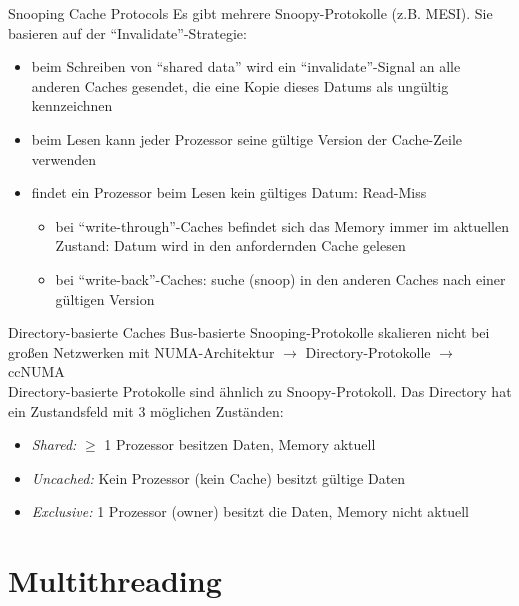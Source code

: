 \begin{defi}{Snooping Cache Protocols}
    Es gibt mehrere Snoopy-Protokolle (z.B. MESI). 
    Sie basieren auf der \enquote{Invalidate}-Strategie:
    \begin{itemize}
        \item beim Schreiben von \enquote{shared data} wird ein \enquote{invalidate}-Signal an alle anderen Caches gesendet,
              die eine Kopie dieses Datums als ungültig kennzeichnen
        \item beim Lesen kann jeder Prozessor seine gültige Version der Cache-Zeile verwenden
        \item findet ein Prozessor beim Lesen kein gültiges Datum: Read-Miss
              \begin{itemize}
                  \item bei \enquote{write-through}-Caches befindet sich das Memory immer im aktuellen Zustand:
                        Datum wird in den anfordernden Cache gelesen
                  \item bei \enquote{write-back}-Caches:
                        suche (snoop) in den anderen Caches nach einer gültigen Version
              \end{itemize}
    \end{itemize}
\end{defi}

\begin{defi}{Directory-basierte Caches}
    Bus-basierte Snooping-Protokolle skalieren nicht bei großen Netzwerken mit NUMA-Architektur 
    $\to$ Directory-Protokolle $\to$ ccNUMA \\
    Directory-basierte Protokolle sind ähnlich zu Snoopy-Protokoll.
    Das Directory hat ein Zustandsfeld mit 3 möglichen Zuständen:
    \begin{itemize}
        \item \emph{Shared:}     $\geq$ 1 Prozessor besitzen Daten, Memory aktuell
        \item \emph{Uncached:}   Kein Prozessor (kein Cache) besitzt gültige Daten
        \item \emph{Exclusive:}  1 Prozessor (owner) besitzt die Daten, Memory nicht aktuell
    \end{itemize}
\end{defi}

\section{Multithreading}

